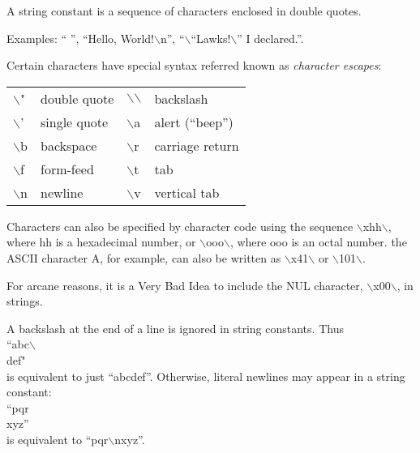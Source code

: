 \documentclass[a4paper,11pt,notitlepage,onecolumn]{book}
\begin{document}
A string constant is a sequence of characters enclosed in double
quotes.

Examples: \textsf{`` ''}, \textsf{``Hello, World!{\ensuremath{\backslash}}n''}, \textsf{``{\ensuremath{\backslash}}``Lawks!{\ensuremath{\backslash}}'' I declared.''}.

Certain characters have special syntax referred known as \emph{character
escapes}:

\begin{tabular}{llll}
\textsf{{\ensuremath{\backslash}}"} & double quote &
\textsf{{\ensuremath{\backslash}}{\ensuremath{\backslash}}} & backslash \\
\textsf{{\ensuremath{\backslash}}'} & single quote &
\textsf{{\ensuremath{\backslash}}a} & alert (``beep'') \\
\textsf{{\ensuremath{\backslash}}b} & backspace &
\textsf{{\ensuremath{\backslash}}r} & carriage return \\
\textsf{{\ensuremath{\backslash}}f} & form-feed &
\textsf{{\ensuremath{\backslash}}t} & tab \\
\textsf{{\ensuremath{\backslash}}n} & newline &
\textsf{{\ensuremath{\backslash}}v} & vertical tab
\end{tabular}


Characters can also be specified by character code using the sequence
\textsf{{\ensuremath{\backslash}}xhh{\ensuremath{\backslash}}}, where \textsf{hh} is a hexadecimal number, or \textsf{{\ensuremath{\backslash}}ooo{\ensuremath{\backslash}}}, where \textsf{ooo} is an
octal number.  the ASCII character \textsf{A}, for example, can also be written
as \textsf{{\ensuremath{\backslash}}x41{\ensuremath{\backslash}}} or \textsf{{\ensuremath{\backslash}}101{\ensuremath{\backslash}}}.

\Note For arcane reasons, it is a Very Bad Idea to include the \textsf{NUL}
character, \textsf{{\ensuremath{\backslash}}x00{\ensuremath{\backslash}}}, in strings.

A backslash at the end of a line is ignored in string constants.  Thus
\\\textsf{``abc{\ensuremath{\backslash}}}\\\textsf{def"}\\ is equivalent to just \textsf{``abcdef''}.  Otherwise, literal
newlines may appear in a string constant:
\\\textsf{``pqr}\\\textsf{xyz''}\\ is equivalent to \textsf{``pqr{\ensuremath{\backslash}}nxyz''}.
\end{document}
